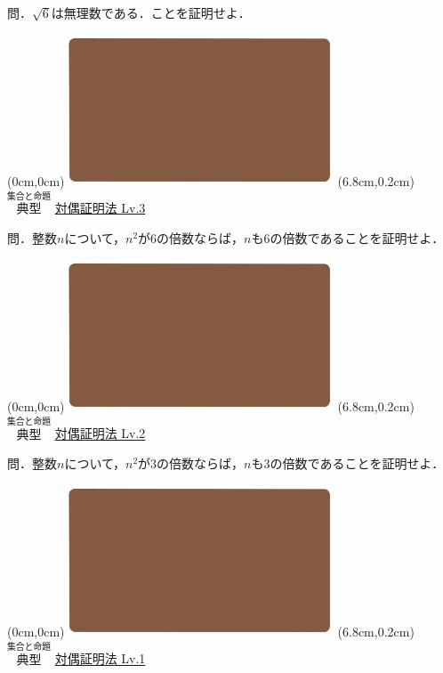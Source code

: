 \documentclass[10pt,
fleqn,
dvipdfmx,
uplatex
]{jsarticle}
\begin{document}
\huge 
問．$\sqrt 6$は無理数である．ことを証明せよ．


\newpage



\at(0cm,0cm){\includegraphics[width=8cm,bb=0 0 1920 1080]{./youtube/thumbnails/templates/smart_background/集合と命題.jpeg}}
\at(6.8cm,0.2cm){\small\color{bradorange}$\overset{\text{集合と命題}}{\text{典型}}$}
{\color{orange}\LARGE\underline{対偶証明法 Lv.3 }}\vspace{0.3zw}

\LARGE 
問．整数$n$について，$n^2$が$6$の倍数ならば，$n$も$6$の倍数であることを証明せよ．


\newpage



\at(0cm,0cm){\includegraphics[width=8cm,bb=0 0 1920 1080]{./youtube/thumbnails/templates/smart_background/集合と命題.jpeg}}
\at(6.8cm,0.2cm){\small\color{bradorange}$\overset{\text{集合と命題}}{\text{典型}}$}
{\color{orange}\LARGE\underline{対偶証明法 Lv.2 }}\vspace{0.3zw}

\LARGE 
問．整数$n$について，$n^2$が$3$の倍数ならば，$n$も$3$の倍数であることを証明せよ．


\newpage



\at(0cm,0cm){\includegraphics[width=8cm,bb=0 0 1920 1080]{./youtube/thumbnails/templates/smart_background/集合と命題.jpeg}}
\at(6.8cm,0.2cm){\small\color{bradorange}$\overset{\text{集合と命題}}{\text{典型}}$}
{\color{orange}\LARGE\underline{対偶証明法 Lv.1 }}\vspace{0.3zw}
\end{document}
